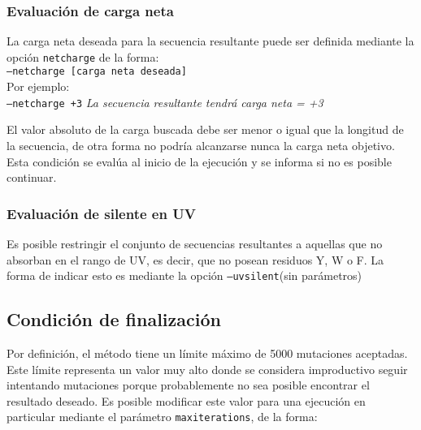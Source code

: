 \subsubsection{Evaluación de carga neta}

La carga neta deseada para la secuencia resultante puede ser definida mediante la opción \texttt{netcharge} de la forma: \\
\indent \texttt{--netcharge [carga neta deseada]} 
\\Por ejemplo: \\
\indent \texttt{--netcharge +3} \hspace{0.5cm} \textit{La secuencia resultante tendrá carga neta = +3}

El valor absoluto de la carga buscada debe ser menor o igual que la longitud de la secuencia, de otra forma no podría alcanzarse nunca la carga neta objetivo.
Esta condición se evalúa al inicio de la ejecución y se informa si no es posible continuar.


\subsubsection{Evaluación de silente en UV}\label{uvsilent}

Es posible restringir el conjunto de secuencias resultantes a aquellas que no absorban en el rango de UV, es decir, que no posean residuos Y, W o F.
La forma de indicar esto es mediante la opción \texttt{--uvsilent}(sin parámetros)



\subsection{Condición de finalización} \label{condicionFin}

Por definición, el método tiene un límite máximo de 5000 mutaciones aceptadas.
Este límite representa un valor muy alto donde se considera improductivo seguir intentando mutaciones porque probablemente no sea posible encontrar el resultado deseado.
Es posible modificar este valor para una ejecución en particular mediante el parámetro \texttt{maxiterations}, de la forma:

